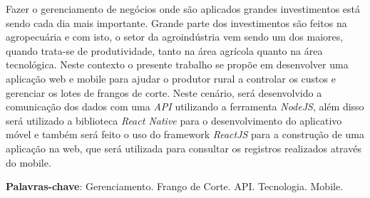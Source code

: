 
\begin{resumo}[RESUMO]
\begin{SingleSpacing}


Fazer o gerenciamento de negócios onde são aplicados grandes investimentos está sendo cada dia mais importante. Grande parte dos investimentos são feitos na agropecuária e com isto, o setor da agroindústria vem sendo um dos maiores, quando trata-se de produtividade, tanto na área agrícola quanto na área tecnológica. Neste contexto o presente trabalho se propõe em  desenvolver uma aplicação web e mobile para ajudar o produtor rural a controlar os custos e gerenciar os lotes de frangos de corte. Neste cenário, será desenvolvido a comunicação dos dados com uma \textit{API} utilizando a ferramenta \textit{NodeJS}, além disso será utilizado a biblioteca \textit{React Native} para o desenvolvimento do aplicativo móvel e também será feito o uso do framework \textit{ReactJS} para a construção de uma aplicação na web, que será utilizada para consultar os registros realizados através do mobile. 


\textbf{Palavras-chave}: Gerenciamento. Frango de Corte. API. Tecnologia. Mobile.

\end{SingleSpacing}
\end{resumo}

